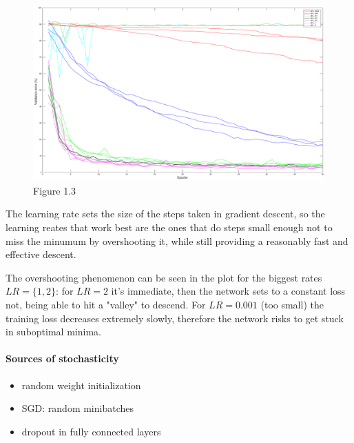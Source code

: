 \documentclass{article}
\begin{document}
    \begin{figure}[!htb]
        \centering
        \includegraphics[width=\textwidth]{figures/sc1_val_err}
        \captionsetup{labelformat=empty}
        \caption{Figure 1.3}
    \end{figure}
    
    The learning rate sets the size of the steps taken in gradient descent, so the learning reates that work best are the ones that do steps small enough not to miss the minumum by overshooting it,
    while still providing a reasonably fast and effective descent. 
    
    The overshooting phenomenon can be seen in the plot for the biggest rates $LR = \{1,2\}$: for $LR = 2$ it's immediate, then the network sets to a constant loss 
    not, being able to hit a "valley" to descend.
    For $LR = 0.001$ (too small) the training loss decreases extremely slowly, therefore the network risks to get stuck in suboptimal minima.
    
    \paragraph*{Sources of stochasticity}
        \begin{itemize}
        \item random weight initialization
        \item SGD: random minibatches
        \item dropout in fully connected layers
        \end{itemize}
    
    
    
\end{document}
